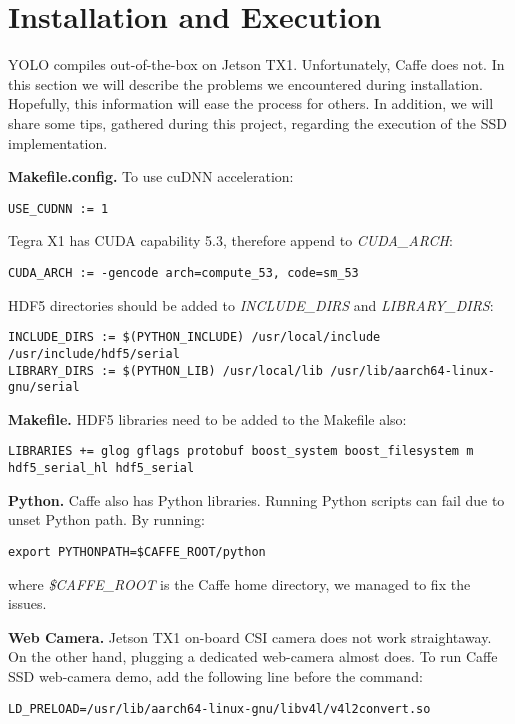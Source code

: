 \section{Installation and Execution}
\label{sec:installation}

YOLO compiles out-of-the-box on Jetson TX1. Unfortunately, Caffe does not. In this section we will describe the problems we encountered during installation. Hopefully, this information will ease the process for others. In addition, we will share some tips, gathered during this project, regarding the execution of the SSD implementation.

\textbf{Makefile.config.}
To use cuDNN acceleration:
\begin{lstlisting} 
USE_CUDNN := 1
\end{lstlisting}

Tegra X1 has CUDA capability 5.3, therefore append to \textit{CUDA\_ARCH}: 
\begin{lstlisting} 
CUDA_ARCH := -gencode arch=compute_53, code=sm_53
\end{lstlisting}

HDF5 directories should be added to \textit{INCLUDE\_DIRS} and \textit{LIBRARY\_DIRS}:
\begin{lstlisting} 
INCLUDE_DIRS := $(PYTHON_INCLUDE) /usr/local/include /usr/include/hdf5/serial
LIBRARY_DIRS := $(PYTHON_LIB) /usr/local/lib /usr/lib/aarch64-linux-gnu/serial
\end{lstlisting}

\textbf{Makefile.}
HDF5 libraries need to be added to the Makefile also:
\begin{lstlisting} 
LIBRARIES += glog gflags protobuf boost_system boost_filesystem m hdf5_serial_hl hdf5_serial
\end{lstlisting}

\textbf{Python.}
Caffe also has Python libraries. Running Python scripts can fail due to unset Python path. By running:
\begin{lstlisting} 
export PYTHONPATH=$CAFFE_ROOT/python
\end{lstlisting}
where \textit{\$CAFFE\_ROOT} is the Caffe home directory, we managed to fix the issues.

\textbf{Web Camera.}
Jetson TX1 on-board CSI camera does not work straightaway. On the other hand, plugging a dedicated web-camera almost does. To run Caffe SSD web-camera demo, add the following line before the command:
\begin{lstlisting} 
LD_PRELOAD=/usr/lib/aarch64-linux-gnu/libv4l/v4l2convert.so
\end{lstlisting}

